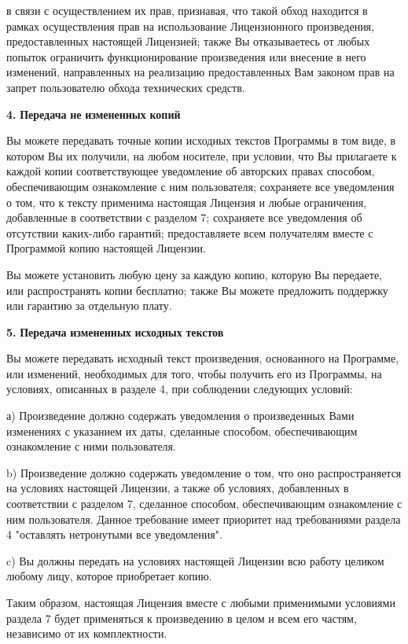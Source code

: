 в связи с осуществлением их прав, признавая, что такой обход находится в рамках осуществления прав на использование Лицензионного произведения, предоставленных настоящей Лицензией; также Вы отказываетесь от любых попыток ограничить функционирование произведения или внесение в него изменений, направленных на реализацию предоставленных Вам законом прав на запрет пользователю обхода технических средств.

{\bfseries{4.}} {\bfseries{Передача}} {\bfseries{не}} {\bfseries{измененных}} {\bfseries{копий}}

Вы можете передавать точные копии исходных текстов Программы в том виде, в котором Вы их получили, на любом носителе, при условии, что Вы прилагаете к каждой копии соответствующее уведомление об авторских правах способом, обеспечивающим ознакомление с ним пользователя; сохраняете все уведомления о том, что к тексту применима настоящая Лицензия и любые ограничения, добавленные в соответствии с разделом 7; сохраняете все уведомления об отсутствии каких-\/либо гарантий; предоставляете всем получателям вместе с Программой копию настоящей Лицензии.

Вы можете установить любую цену за каждую копию, которую Вы передаете, или распространять копии бесплатно; также Вы можете предложить поддержку или гарантию за отдельную плату.

{\bfseries{5.}} {\bfseries{Передача}} {\bfseries{измененных}} {\bfseries{исходных}} {\bfseries{текстов}}

Вы можете передавать исходный текст произведения, основанного на Программе, или изменений, необходимых для того, чтобы получить его из Программы, на условиях, описанных в разделе 4, при соблюдении следующих условий\+:

а) Произведение должно содержать уведомления о произведенных Вами изменениях с указанием их даты, сделанные способом, обеспечивающим ознакомление с ними пользователя.

b) Произведение должно содержать уведомление о том, что оно распространяется на условиях настоящей Лицензии, а также об условиях, добавленных в соответствии с разделом 7, сделанное способом, обеспечивающим ознакомление с ним пользователя. Данное требование имеет приоритет над требованиями раздела 4 "{}оставлять нетронутыми все уведомления"{}.

c) Вы должны передать на условиях настоящей Лицензии всю работу целиком любому лицу, которое приобретает копию.

Таким образом, настоящая Лицензия вместе с любыми применимыми условиями раздела 7 будет применяться к произведению в целом и всем его частям, независимо от их комплектности.

